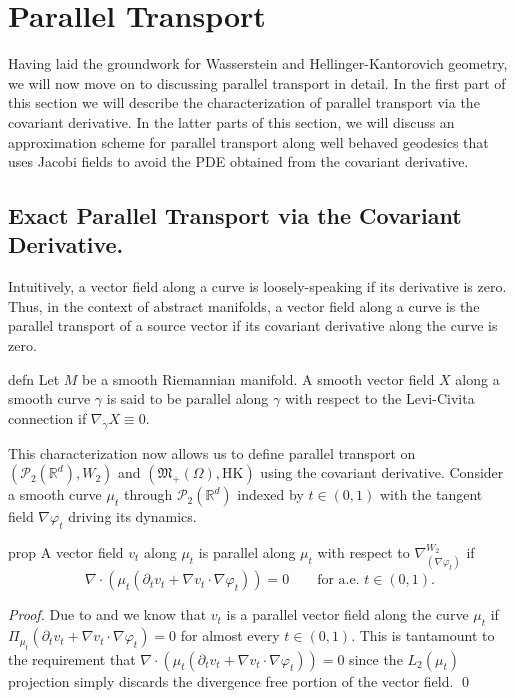 \documentclass[11pt]{article}
\newcommand{\man}{M}
\begin{document}
\section{Parallel Transport}

Having laid the groundwork for Wasserstein and Hellinger-Kantorovich geometry, we will now move on to discussing parallel transport in detail. In the first part of this section we will describe the characterization of parallel transport via the covariant derivative. In the latter parts of this section, we will discuss an approximation scheme for parallel transport along well behaved geodesics that uses Jacobi fields to avoid the PDE obtained from the covariant derivative.   

\subsection{Exact Parallel Transport via the Covariant Derivative.} 
Intuitively, a vector field along a curve is  loosely-speaking if its derivative is zero. Thus, in the context of abstract manifolds, a vector field along a curve is the parallel transport of a source vector if its covariant derivative along the curve is zero.
\begin{restatable}{defn}{} \label{parallel transport on general manifolds}
    Let $\man$ be a smooth Riemannian manifold. A smooth vector field $X$ along a smooth curve $\gamma$ is said to be parallel along $\gamma$ with respect to the Levi-Civita connection if $\nabla_{\dot \gamma}X \equiv 0$.
\end{restatable}
This characterization now allows us to define parallel transport on $(\mathcal{P}_2(\mathbb{R}^d), W_2)$ and $(\mathfrak{M}_+(\Omega), \text{HK})$ using the covariant derivative. Consider a smooth curve $\mu_t$ through $\mathcal{P}_2(\mathbb{R}^d)$ indexed by $t \in (0, 1)$ with the tangent field $\nabla \varphi_t$ driving its dynamics. 

\begin{restatable}{prop}{} \label{Wasserstein parallel transport pde}
    A vector field $v_t$ along $\mu_t$ is parallel along $\mu_t$ with respect to $\nabla_{(\nabla\varphi_t)}^{W_2}$ if
    \begin{equation*}
        \nabla \cdot \left(\mu_t\left(\partial_t v_t + \nabla v_t \cdot \nabla \varphi_t\right)\right) = 0 \qquad \text{for a.e. $t \in (0,1).$}
    \end{equation*}
\end{restatable}
\noindent \textit{Proof.} Due to  and  we know that $v_t$ is a parallel vector field along the curve $\mu_t$ if $\Pi_{\mu_t}\left(\partial_tv_t + \nabla v_t \cdot \nabla\varphi_t\right) = 0$ for almost every $t \in (0,1).$ This is tantamount to the requirement that $\nabla \cdot \left(\mu_t(\partial_tv_t + \nabla v_t \cdot \nabla\varphi_t)\right) = 0$ since the $L_2(\mu_t)$ projection simply discards the divergence free portion of the vector field. \qed{}
\end{document}
